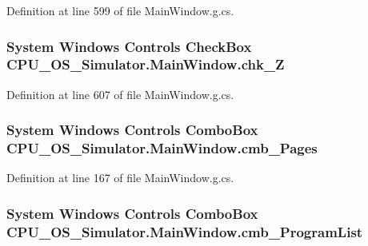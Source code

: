 Definition at line 599 of file Main\+Window.\+g.\+cs.

\hypertarget{class_c_p_u___o_s___simulator_1_1_main_window_a70c1a75df218201391cf5e0615a600f1}{}
\subsubsection[{chk\+\_\+\+Z}]{\setlength{\rightskip}{0pt plus 5cm}System Windows Controls Check\+Box C\+P\+U\+\_\+\+O\+S\+\_\+\+Simulator.\+Main\+Window.\+chk\+\_\+\+Z\hspace{0.3cm}{\ttfamily [package]}}\label{class_c_p_u___o_s___simulator_1_1_main_window_a70c1a75df218201391cf5e0615a600f1}


Definition at line 607 of file Main\+Window.\+g.\+cs.

\hypertarget{class_c_p_u___o_s___simulator_1_1_main_window_a8da421354f40baef03909c87c3407e3c}{}
\subsubsection[{cmb\+\_\+\+Pages}]{\setlength{\rightskip}{0pt plus 5cm}System Windows Controls Combo\+Box C\+P\+U\+\_\+\+O\+S\+\_\+\+Simulator.\+Main\+Window.\+cmb\+\_\+\+Pages\hspace{0.3cm}{\ttfamily [package]}}\label{class_c_p_u___o_s___simulator_1_1_main_window_a8da421354f40baef03909c87c3407e3c}


Definition at line 167 of file Main\+Window.\+g.\+cs.

\hypertarget{class_c_p_u___o_s___simulator_1_1_main_window_a9871f5933923725d4386a7a7f3f8828f}{}
\subsubsection[{cmb\+\_\+\+Program\+List}]{\setlength{\rightskip}{0pt plus 5cm}System Windows Controls Combo\+Box C\+P\+U\+\_\+\+O\+S\+\_\+\+Simulator.\+Main\+Window.\+cmb\+\_\+\+Program\+List\hspace{0.3cm}{\ttfamily [package]}}\label{class_c_p_u___o_s___simulator_1_1_main_window_a9871f5933923725d4386a7a7f3f8828f}


